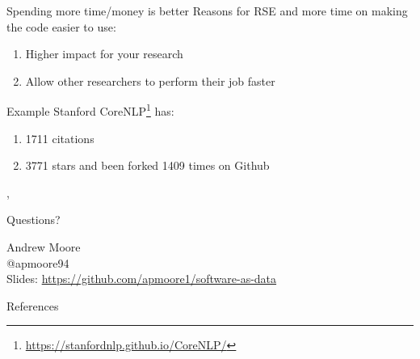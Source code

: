 \documentclass[10pt]{beamer}
\begin{document}
\begin{frame}{Spending more time/money is better}
Reasons for RSE and more time on making the code easier to use:
\begin{enumerate}
\item Higher impact for your research
\item Allow other researchers to perform their job faster
\end{enumerate}
\begin{block}{Example}
Stanford CoreNLP\cite{corenlp}\footnote{\url{https://stanfordnlp.github.io/CoreNLP/}} has:
\begin{enumerate}
\item 1711 citations
\item 3771 stars and been forked 1409 times on Github
\end{enumerate}, 
\end{block}
\end{frame}



\begin{frame}[plain]
\begin{center}
\huge Questions?
\end{center}
\centering
Andrew Moore
\\
@apmoore94
\\
Slides: \url{https://github.com/apmoore1/software-as-data}
\end{frame}


\begin{frame}[allowframebreaks]{References}
  
  
\end{frame}
\end{document}
